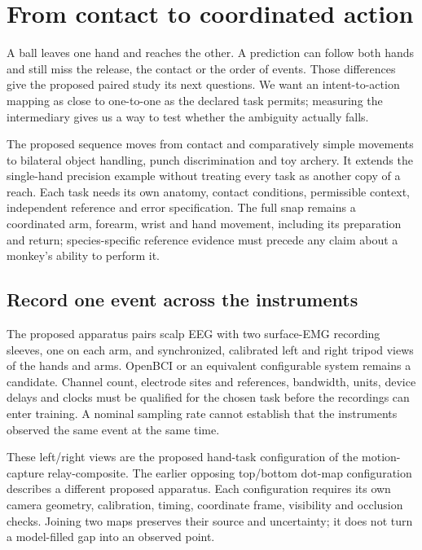 \section{From contact to coordinated action}

A ball leaves one hand and reaches the other. A prediction can follow both hands
and still miss the release, the contact or the order of events. Those differences
give the proposed paired study its next questions. We want an intent-to-action
mapping as close to one-to-one as the declared task permits; measuring the
intermediary gives us a way to test whether the ambiguity actually falls.

The proposed sequence moves from contact and comparatively simple movements to
bilateral object handling, punch discrimination and toy archery. It extends the
single-hand precision example without treating every task as another copy of a
reach. Each task needs its own anatomy, contact conditions, permissible context,
independent reference and error specification. The full snap remains a coordinated
arm, forearm, wrist and hand movement, including its preparation and return;
species-specific reference evidence must precede any claim about a monkey's
ability to perform it.

\subsection{Record one event across the instruments}

The proposed apparatus pairs scalp EEG with two surface-EMG recording sleeves,
one on each arm, and synchronized, calibrated left and right tripod views of the
hands and arms. OpenBCI or an equivalent configurable system remains a candidate.
Channel count, electrode sites and references, bandwidth, units, device delays
and clocks must be qualified for the chosen task before the recordings can enter
training. A nominal sampling rate cannot establish that the instruments observed
the same event at the same time.

These left/right views are the proposed hand-task configuration of the
motion-capture relay-composite. The earlier opposing top/bottom dot-map
configuration describes a different proposed apparatus. Each configuration
requires its own camera geometry, calibration, timing, coordinate frame,
visibility and occlusion checks. Joining two maps preserves their source and
uncertainty; it does not turn a model-filled gap into an observed point.

